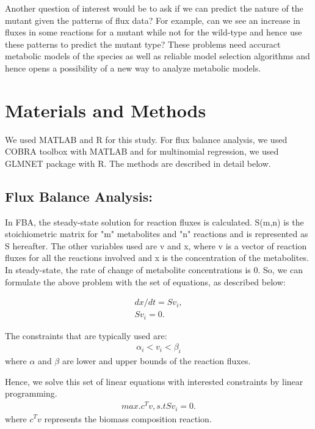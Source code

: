 \documentclass[12pt]{article}
\begin{document}
\bigskip
\noindent
Another question of interest would be to ask if we can predict the nature of the mutant given the patterns of flux data? For example, can we see an increase in fluxes in some reactions for a mutant while not for the wild-type and hence use these patterns to predict the mutant type? These problems need accuract metabolic models of the species as well as reliable model selection algorithms and hence opens a possibility of a new way to analyze metabolic models.


\section*{Materials and Methods}
We used MATLAB and R for this study. For flux balance analysis, we used COBRA toolbox \cite{Schellenbergeretal2011} with MATLAB and for multinomial regression, we used GLMNET package \cite{Friedmanetal2010} with R. The methods are described in detail below.

\subsection*{Flux Balance Analysis:} 
In FBA, the steady-state solution for reaction fluxes is calculated. S(m,n) is the stoichiometric matrix for "m" metabolites and "n" reactions and is represented as S hereafter. The other variables used are v and x, where v is a vector of reaction fluxes for all the reactions involved and x is the concentration of the metabolites. In steady-state, the rate of change of metabolite concentrations is 0. So, we can formulate the above problem with the set of equations, as described below:

\begin{align}
dx/dt = Sv_{i}, \\
Sv_{i}=0.
\end{align}

The constraints that are typically used are: 
\begin{align}
\alpha_{i}<v_{i}<\beta_{i}
\end{align}
where $\alpha$ and $\beta$ are lower and upper bounds of the reaction fluxes.

Hence, we solve this set of linear equations with interested constraints by linear programming.
\begin{align}
{max.} c^Tv, s. t Sv_{i}=0.
\end{align}
where $c^Tv$ represents the biomass composition reaction.
\end{document}
